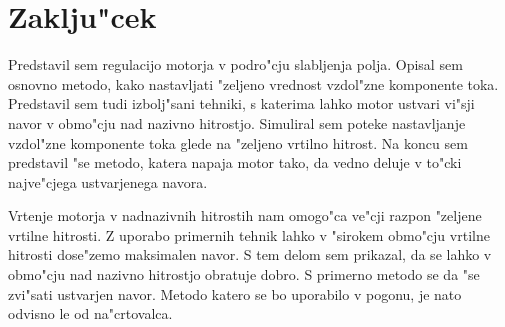 \documentclass[journal,a4paper,twoside]{sty/IEEEtran}
\begin{document}
\section{Zaklju"cek}

Predstavil sem regulacijo motorja v podro"cju slabljenja polja. Opisal sem osnovno metodo, kako nastavljati "zeljeno vrednost vzdol"zne komponente toka. Predstavil sem tudi izbolj"sani tehniki, s katerima lahko motor ustvari vi"sji navor v obmo"cju nad nazivno hitrostjo. Simuliral sem poteke nastavljanje vzdol"zne komponente toka glede na "zeljeno vrtilno hitrost. Na koncu sem predstavil "se metodo, katera napaja motor tako, da vedno deluje v to"cki najve"cjega ustvarjenega navora.

Vrtenje motorja v nadnazivnih hitrostih nam omogo"ca ve"cji razpon "zeljene vrtilne hitrosti. Z uporabo primernih tehnik lahko v "sirokem obmo"cju vrtilne hitrosti dose"zemo maksimalen navor. S tem delom sem prikazal, da se lahko v obmo"cju nad nazivno hitrostjo obratuje dobro. S primerno metodo se da "se zvi"sati ustvarjen navor. Metodo katero se bo uporabilo v pogonu, je nato odvisno le od na"crtovalca.



%
%
%
%
%
%
\end{document}
